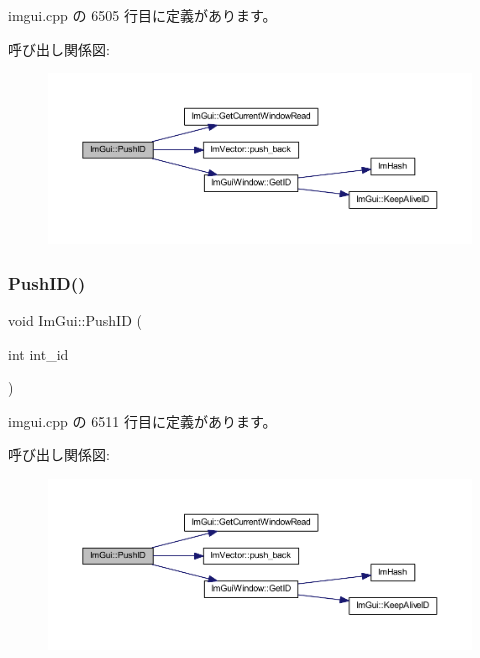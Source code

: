  imgui.\+cpp の 6505 行目に定義があります。

呼び出し関係図\+:\nopagebreak
\begin{figure}[H]
\begin{center}
\leavevmode
\includegraphics[width=350pt]{namespace_im_gui_af9cf42fdf2fbc5eeec7521de14996bfb_cgraph}
\end{center}
\end{figure}
\mbox{\label{namespace_im_gui_a6a11664be2a0b9a0e7054bb339e009ac}} 
\subsubsection{\texorpdfstring{Push\+I\+D()}{PushID()}\hspace{0.1cm}{\footnotesize\ttfamily [4/4]}}
{\footnotesize\ttfamily void Im\+Gui\+::\+Push\+ID (\begin{DoxyParamCaption}\item[{int}]{int\+\_\+id }\end{DoxyParamCaption})}



 imgui.\+cpp の 6511 行目に定義があります。

呼び出し関係図\+:\nopagebreak
\begin{figure}[H]
\begin{center}
\leavevmode
\includegraphics[width=350pt]{namespace_im_gui_a6a11664be2a0b9a0e7054bb339e009ac_cgraph}
\end{center}
\end{figure}
\mbox{\label{namespace_im_gui_ac7301f6378333f6d17f47823eed9e00a}} 
